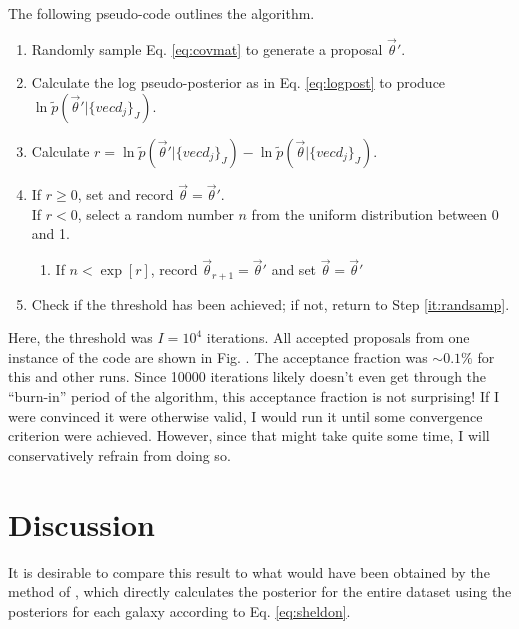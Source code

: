\documentclass[12pt, onecolumn]{emulateapj}
\begin{document}
The following pseudo-code outlines the algorithm.

\begin{enumerate}
\item \label{it:randsamp} Randomly sample Eq. \ref{eq:covmat} to generate a proposal $\vec{\theta}'$.
\item Calculate the log pseudo-posterior as in Eq. \ref{eq:logpost} to produce $\ln\tilde{p}(\vec{\theta}'|\{vec{d}_{j}\}_{J})$.
\item Calculate $r=\ln\tilde{p}(\vec{\theta}'|\{vec{d}_{j}\}_{J})-\ln\tilde{p}(\vec{\theta}|\{vec{d}_{j}\}_{J})$.
\item If $r\geq0$, set and record $\vec{\theta}=\vec{\theta}'$.\\
If $r<0$, select a random number $n$ from the uniform distribution between 0 and 1.
\begin{enumerate}
\item If $n<\exp[r]$, record $\vec{\theta}_{r+1}=\vec{\theta}'$ and set $\vec{\theta}=\vec{\theta}'$
\end{enumerate}
\item Check if the threshold has been achieved; if not, return to Step \ref{it:randsamp}.
\end{enumerate}

Here, the threshold was $I=10^{4}$ iterations.  All accepted proposals from one instance of the code are shown in Fig. %
.  The acceptance fraction was $\sim0.1\%$ for this and other runs.  Since 10000 iterations likely doesn't even get through the ``burn-in'' period of the algorithm, this acceptance fraction is not surprising!  If I were convinced it were otherwise valid, I would run it until some convergence criterion were achieved.  However, since that might take quite some time, I will conservatively refrain from doing so.


\section{Discussion}

It is desirable to compare this result to what would have been obtained by the method of \citet{she11}, which directly calculates the posterior for the entire dataset using the posteriors for each galaxy according to Eq. \ref{eq:sheldon}.
\end{document}
